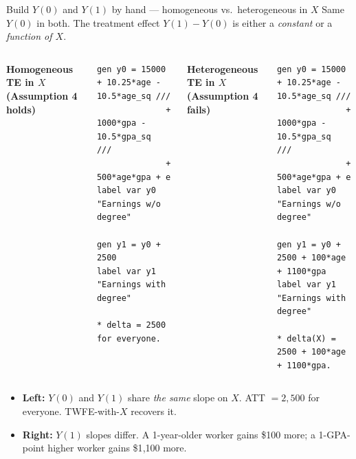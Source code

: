 \documentclass[aspectratio=169,11pt]{beamer}
\begin{document}
\begin{frame}[fragile]{Build $Y(0)$ and $Y(1)$ by hand --- homogeneous vs.\ heterogeneous in $X$}
\vspace{0.2em}
\footnotesize
Same $Y(0)$ in both. \;The treatment effect $Y(1) - Y(0)$ is either a \textit{constant} or a \textit{function of $X$}.
\vspace{0.4em}
\begin{columns}[T,onlytextwidth]
\textbf{Homogeneous TE in $X$ \;(Assumption 4 holds)}
\begin{lstlisting}[basicstyle=\ttfamily\tiny]
gen y0 = 15000 + 10.25*age - 10.5*age_sq ///
              + 1000*gpa - 10.5*gpa_sq   ///
              + 500*age*gpa + e
label var y0 "Earnings w/o degree"

gen y1 = y0 + 2500
label var y1 "Earnings with degree"

* delta = 2500 for everyone.
\end{lstlisting}
\hfill
{}
\textbf{Heterogeneous TE in $X$ \;(Assumption 4 fails)}
\begin{lstlisting}[basicstyle=\ttfamily\tiny]
gen y0 = 15000 + 10.25*age - 10.5*age_sq ///
              + 1000*gpa - 10.5*gpa_sq   ///
              + 500*age*gpa + e
label var y0 "Earnings w/o degree"

gen y1 = y0 + 2500 + 100*age + 1100*gpa
label var y1 "Earnings with degree"

* delta(X) = 2500 + 100*age + 1100*gpa.
\end{lstlisting}
\end{columns}
\vspace{0.5em}
\begin{itemize}\setlength\itemsep{1pt}
  \item \textbf{Left:} $Y(0)$ and $Y(1)$ share \textit{the same} slope on $X$. \;ATT $= 2{,}500$ for everyone. TWFE-with-$X$ recovers it.
  \item \textbf{Right:} $Y(1)$ slopes differ. \;A 1-year-older worker gains \$100 more; a 1-GPA-point higher worker gains \$1{,}100 more. \;
\end{itemize}
\end{frame}
\end{document}
